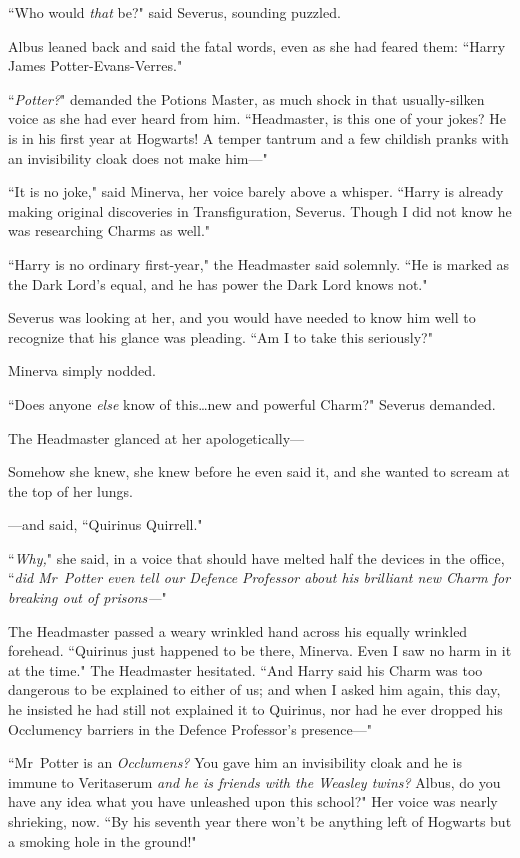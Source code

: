 ``Who would \emph{that} be?" said Severus, sounding puzzled.

Albus leaned back and said the fatal words, even as she had feared them: ``Harry James Potter-Evans-Verres."

``\emph{Potter?}" demanded the Potions Master, as much shock in that usually-silken voice as she had ever heard from him. ``Headmaster, is this one of your jokes? He is in his first year at Hogwarts! A temper tantrum and a few childish pranks with an invisibility cloak does not make him—"

``It is no joke," said Minerva, her voice barely above a whisper. ``Harry is already making original discoveries in Transfiguration, Severus. Though I did not know he was researching Charms as well."

``Harry is no ordinary first-year," the Headmaster said solemnly. ``He is marked as the Dark Lord's equal, and he has power the Dark Lord knows not."

Severus was looking at her, and you would have needed to know him well to recognize that his glance was pleading. ``Am I to take this seriously?"

Minerva simply nodded.

``Does anyone \emph{else} know of this…new and powerful Charm?" Severus demanded.

The Headmaster glanced at her apologetically—

Somehow she knew, she knew before he even said it, and she wanted to scream at the top of her lungs.

—and said, ``Quirinus Quirrell."

``\emph{Why,}" she said, in a voice that should have melted half the devices in the office, ``\emph{did Mr~Potter even \emph{tell} our Defence Professor about his brilliant new Charm for breaking out of prisons—}"

The Headmaster passed a weary wrinkled hand across his equally wrinkled forehead. ``Quirinus just happened to be there, Minerva. Even I saw no harm in it at the time." The Headmaster hesitated. ``And Harry said his Charm was too dangerous to be explained to either of us; and when I asked him again, this day, he insisted he had still not explained it to Quirinus, nor had he ever dropped his Occlumency barriers in the Defence Professor's presence—"

``Mr~Potter is an \emph{Occlumens?} You gave him an invisibility cloak and he is immune to Veritaserum \emph{and he is friends with the Weasley twins?} Albus, do you have any idea what you have unleashed upon this school?" Her voice was nearly shrieking, now. ``By his seventh year there won't be anything left of Hogwarts but a smoking hole in the ground!"

